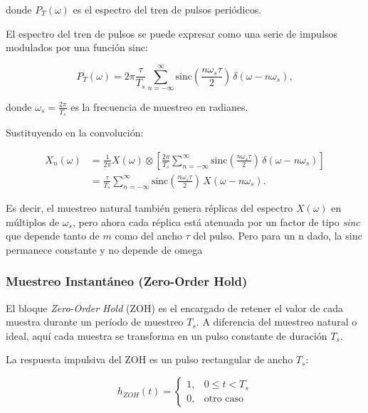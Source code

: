 donde $P_T(\omega)$ es el espectro del tren de pulsos periódicos. 

\bigskip

El espectro del tren de pulsos se puede expresar como una serie de impulsos modulados por una función
$\mathrm{sinc}$:

\begin{equation}
    P_T(\omega) = 2\pi\frac{\tau}{T_s} \sum_{n=-\infty}^{\infty} 
    \mathrm{sinc}\!\left(\frac{n\omega_s \tau}{2}\right) \, \delta(\omega - n\omega_s),
\end{equation}

donde $\omega_s = \tfrac{2\pi}{T_s}$ es la frecuencia de muestreo en radianes. 

\bigskip

Sustituyendo en la convolución:

\begin{align}
    X_n(\omega) 
    &= \frac{1}{2\pi} X(\omega) \otimes 
       \left[ \frac{2\pi}{T_s} \sum_{n=-\infty}^{\infty} 
       \mathrm{sinc}\!\left(\frac{n\omega_s \tau}{2}\right) \, \delta(\omega - n\omega_s) \right] \\[6pt]
    &= \frac{\tau}{T_s} \sum_{n=-\infty}^{\infty} 
       \mathrm{sinc}\!\left(\frac{n\omega_s \tau}{2}\right) \, X(\omega - n\omega_s).
\end{align}

\bigskip

Es decir, el muestreo natural también genera réplicas del espectro $X(\omega)$ en múltiplos de $\omega_s$, 
pero ahora cada réplica está atenuada por un factor de tipo \textit{sinc} que depende tanto de $m$ como del ancho $\tau$ 
del pulso. Pero para un n dado, la sinc permanece constante y no depende de omega

\subsubsection{Muestreo Instantáneo (Zero-Order Hold)}

El bloque \textit{Zero-Order Hold} (ZOH) es el encargado de retener el valor de cada muestra
durante un período de muestreo $T_s$. A diferencia del muestreo natural o ideal, aquí 
cada muestra se transforma en un pulso constante de duración $T_s$. 

\bigskip

La respuesta impulsiva del ZOH es un pulso rectangular de ancho $T_s$:

\begin{equation}
    h_{ZOH}(t) = 
    \begin{cases}
        1, & 0 \leq t < T_s \\
        0, & \text{otro caso}
    \end{cases}
\end{equation}


